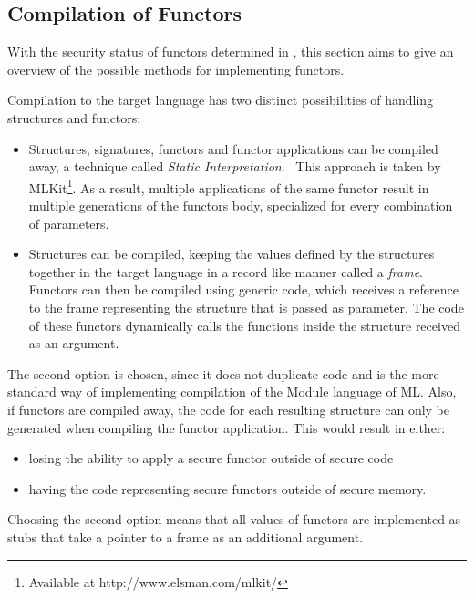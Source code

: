 \subsection{Compilation of Functors}
\label{sec:FunctorCompilation}
With the security status of functors determined in , %
this section aims to give an overview of the possible methods for implementing functors.

Compilation to the target language has two distinct possibilities of handling structures and functors:
\begin{itemize}
    \item Structures, signatures, functors and functor applications can be compiled away, a technique called \emph{Static Interpretation}.~\cite{Elsman}
    This approach is taken by MLKit\footnote{Available at http://www.elsman.com/mlkit/}.
    As a result, multiple applications of the same functor result in multiple generations of the functors body, specialized for every combination of parameters.
    \item Structures can be compiled, keeping the values defined by the structures together in the target language in a record like manner called a \emph{frame}.
    Functors can then be compiled using generic code, which receives a reference to the frame representing the structure that is passed as parameter.
    The code of these functors dynamically calls the functions inside the structure received as an argument.
\end{itemize}

The second option is chosen, since it does not duplicate code and is the more standard way of implementing compilation of the Module language of ML.
Also, if functors are compiled away, the code for each resulting structure can only be generated when compiling the functor application.
This would result in either:
\begin{itemize}
\item losing the ability to apply a secure functor outside of secure code
\item having the code representing secure functors outside of secure memory.
\end{itemize}

\smallskip
Choosing the second option means that all values of functors are implemented as stubs that take a pointer to a frame as an additional argument.


